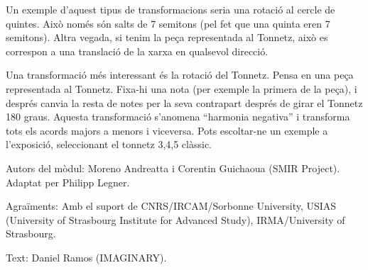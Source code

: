 Un exemple d'aquest tipus de transformacions seria una rotació al cercle de quintes. Això només són salts de 7 semitons (pel fet que una quinta eren 7 semitons). Altra vegada, si tenim la peça representada al Tonnetz, això es correspon a una translació de la xarxa en qualsevol direcció.

Una transformació més interessant és la rotació del Tonnetz. Pensa en una peça representada al Tonnetz. Fixa-hi una nota (per exemple la primera de la peça), i després canvia la resta de notes per la seva contrapart després de girar el Tonnetz 180 graus. Aquesta transformació s'anomena ``harmonia negativa'' i transforma tots els acords majors a menors i viceversa. Pots escoltar-ne un exemple a l'exposició, seleccionant el tonnetz 3,4,5 clàssic.

\begin{sectcredits}
\item[Autors del mòdul:] Moreno Andreatta i Corentin Guichaoua (SMIR Project). Adaptat per Philipp Legner.
\item[Agraïments:] Amb el suport de CNRS/IRCAM/Sorbonne University, USIAS (University of Strasbourg Institute for Advanced Study), IRMA/University of Strasbourg.
\item[Text:] Daniel Ramos (IMAGINARY).
\end{sectcredits}
